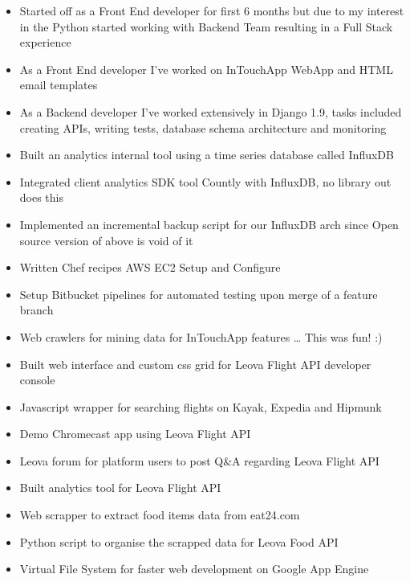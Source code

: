 \documentclass[10pt,a4paper]{altacv}
\begin{document}
\divider\smallskip

\begin{itemize}
\item Started off as a Front End developer for first 6 months but due to my interest in the
Python started working with Backend Team resulting in a Full Stack experience
\item As a Front End developer I’ve worked on InTouchApp WebApp and HTML email templates
\item As a Backend developer I’ve worked extensively in Django 1.9, tasks included
creating APIs, writing tests, database schema architecture and monitoring
\item Built an analytics internal tool using a time series database called InfluxDB
\item Integrated client analytics SDK tool Countly with InfluxDB, no library out does this
\item Implemented an incremental backup script for our InfluxDB arch since
Open source version of above is void of it
\item Written Chef recipes AWS EC2 Setup and Configure
\item Setup Bitbucket pipelines for automated testing upon merge of a feature branch
\item Web crawlers for mining data for InTouchApp features … This was fun! :)
\end{itemize}

\divider\smallskip

\begin{itemize}
\item Built web interface and custom css grid for Leova Flight API developer console
\item Javascript wrapper for searching flights on Kayak, Expedia and Hipmunk
\item Demo Chromecast app using Leova Flight API
\item Leova forum for platform users to post Q\&A regarding Leova Flight API
\item Built analytics tool for Leova Flight API
\item Web scrapper to extract food items data from eat24.com
\item Python script to organise the scrapped data for Leova Food API
\item Virtual File System for faster web development on Google App Engine
\end{itemize}
\end{document}
